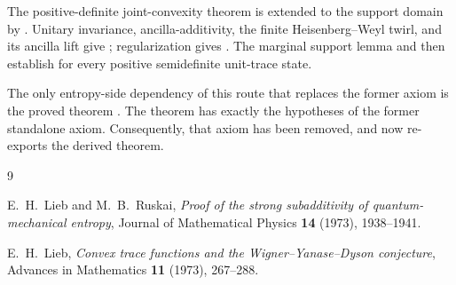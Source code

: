 \documentclass[11pt]{article}
\begin{document}
The positive-definite joint-convexity theorem
 is extended to the support domain by
. Unitary invariance,
ancilla-additivity, the finite Heisenberg--Weyl twirl, and its ancilla lift give
; regularization gives
. The marginal
support lemma and  then establish
 for every positive semidefinite
unit-trace state.

The only entropy-side dependency of this route that replaces the former axiom
is the proved theorem . The theorem
 has exactly the hypotheses of the former
standalone axiom. Consequently, that axiom has been removed, and
 now re-exports the derived theorem.

\begin{thebibliography}{9}

  E.~H.~Lieb and M.~B.~Ruskai,
  \emph{Proof of the strong subadditivity of quantum-mechanical entropy},
  Journal of Mathematical Physics \textbf{14} (1973), 1938--1941.

  E.~H.~Lieb,
  \emph{Convex trace functions and the Wigner--Yanase--Dyson conjecture},
  Advances in Mathematics \textbf{11} (1973), 267--288.

\end{thebibliography}
\end{document}
